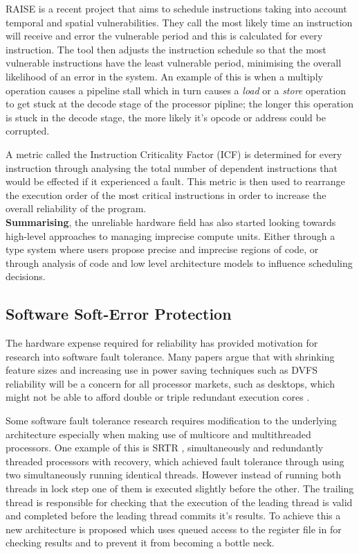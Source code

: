 RAISE \cite{rehman2012raise} is a recent project that aims to schedule instructions taking into account temporal and spatial
vulnerabilities.
They call the most likely time an instruction will receive and error the vulnerable period and this is calculated
for every instruction.
The tool then adjusts the instruction schedule so that the most vulnerable instructions have the least vulnerable period,
minimising the overall likelihood of an error in the system.
An example of this is when a multiply operation causes a pipeline stall which in turn causes a \emph{load} or a \emph{store} operation
to get stuck at the decode stage of the processor pipline;
the longer this operation is stuck in the decode stage, the more likely it's opcode or address could be corrupted.

A metric called the Instruction Criticality Factor (ICF) is determined for every instruction through analysing the total number
of dependent instructions that would be effected if it experienced a fault.
This metric is then used to rearrange the execution order of the most critical instructions in order to increase the
overall reliability of the program.\\

\textbf{Summarising}, the unreliable hardware field has also started looking towards high-level approaches to managing
imprecise compute units. Either through a type system where users propose precise and imprecise regions of code,
 or through analysis of code and low level architecture models to influence scheduling decisions.

\subsection{Software Soft-Error Protection}

The hardware expense required for reliability has provided motivation for research into software fault tolerance.
Many papers argue that with shrinking feature sizes and increasing use in power saving techniques such as DVFS
reliability will be a concern for all processor markets, such as desktops, which might not be able to afford
double or triple redundant execution cores \cite{reis2005swift}.

Some software fault tolerance research requires modification to the underlying architecture especially when making
use of multicore and multithreaded processors.
One example of this is SRTR \cite{vijaykumar2002transient}, simultaneously and redundantly threaded processors with recovery,
which achieved fault tolerance through using two simultaneously running identical threads.
However instead of running both threads in lock step one of them is executed slightly before the other.
The trailing thread is responsible for checking that the execution of the leading thread is valid and
completed before the leading thread commits it's results.
To achieve this a new architecture is proposed which uses queued access to the register file in for checking results and to prevent it from
becoming a bottle neck.

